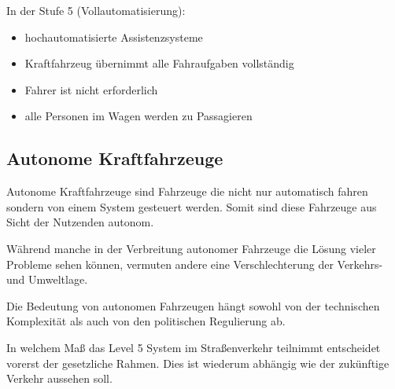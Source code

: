 In der Stufe 5 (Vollautomatisierung):
\begin{itemize}
	\item hochautomatisierte Assistenzsysteme
	\item Kraftfahrzeug übernimmt alle Fahraufgaben vollständig
	\item Fahrer ist nicht erforderlich
	\item alle Personen im Wagen werden zu Passagieren
\end{itemize}

\subsection{Autonome Kraftfahrzeuge}
Autonome Kraftfahrzeuge sind Fahrzeuge die nicht nur automatisch fahren sondern von einem System gesteuert werden.
Somit sind diese Fahrzeuge aus Sicht der Nutzenden autonom.

Während manche in der Verbreitung autonomer Fahrzeuge die Lösung vieler Probleme sehen können,
vermuten andere eine Verschlechterung der Verkehrs- und Umweltlage.

Die Bedeutung von autonomen Fahrzeugen hängt sowohl von der technischen Komplexität als auch von den politischen Regulierung ab.

In welchem Maß das Level 5 System im Straßenverkehr teilnimmt entscheidet vorerst der gesetzliche Rahmen.
Dies ist wiederum abhängig wie der zukünftige Verkehr aussehen soll.